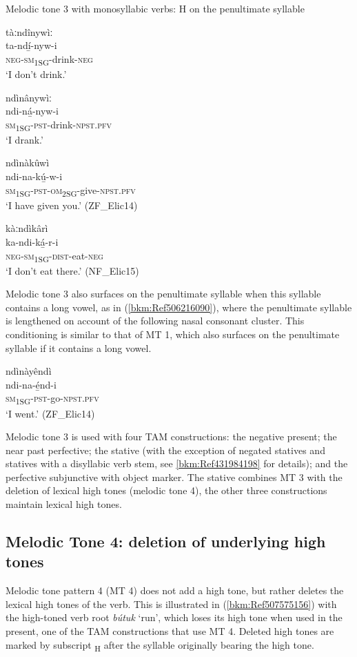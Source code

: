 \ea
\label{bkm:Ref99615756}
  Melodic tone 3 with monosyllabic verbs: H on the penultimate syllable

\ea
\glll tàːndînywìː\\
ta-ndí̲-nyw-i\\
\textsc{neg}-\textsc{sm}\textsubscript{1SG}-drink-\textsc{neg}\\
\glt ‘I don’t drink.’

\ex
\glll ndìnânywìː\\
ndi-ná̲-nyw-i\\
\textsc{sm}\textsubscript{1SG}-\textsc{pst}-drink-\textsc{npst}.\textsc{pfv}\\
\glt ‘I drank.’

\ex
\glll ndìnàkûwì\\
ndi-na-kú̲-w-i\\
\textsc{sm}\textsubscript{1SG}-\textsc{pst}-\textsc{om}\textsubscript{2SG}-give-\textsc{npst}.\textsc{pfv}\\
\glt ‘I have given you.’ (ZF\_Elic14)

\ex
\glll kàːndìkârì\\
ka-ndi-ká̲-r-i\\
\textsc{neg}-\textsc{sm}\textsubscript{1SG}-\textsc{dist}-eat-\textsc{neg}\\
\glt ‘I don’t eat there.’ (NF\_Elic15)
\z\z

Melodic tone 3 also surfaces on the penultimate syllable when this syllable contains a long vowel, as in (\ref{bkm:Ref506216090}), where the penultimate syllable is lengthened on account of the following nasal consonant cluster. This conditioning is similar to that of MT 1, which also surfaces on the penultimate syllable if it contains a long vowel.

\ea
\label{bkm:Ref506216090}
\glll ndìnàyêndì\\
ndi-na-é̲nd-i\\
\textsc{sm}\textsubscript{1SG}-\textsc{pst}-go-\textsc{npst}.\textsc{pfv}\\
\glt ‘I went.’ (ZF\_Elic14)
\z

Melodic tone 3 is used with four TAM constructions: the negative present; the near past perfec\-tive; the stative (with the exception of negated statives and statives with a disyllabic verb stem, see \ref{bkm:Ref431984198} for details); and the perfective subjunctive with object marker. The stative combines MT 3 with the deletion of lexical high tones (melodic tone 4), the other three constructions maintain lexical high tones.

\subsection{Melodic Tone 4: deletion of underlying high tones}
\label{bkm:Ref71540134}\hypertarget{Toc75352632}{}
Melodic tone pattern 4 (MT 4) does not add a high tone, but rather deletes the lexical high tones of the verb. This is illustrated in (\ref{bkm:Ref507575156}) with the high-toned verb root \textit{bútuk} ‘run’, which loses its high tone when used in the present, one of the TAM construc\-tions that use MT 4. Deleted high tones are marked by subscript \textsubscript{H} after the syllable originally bearing the high tone.

